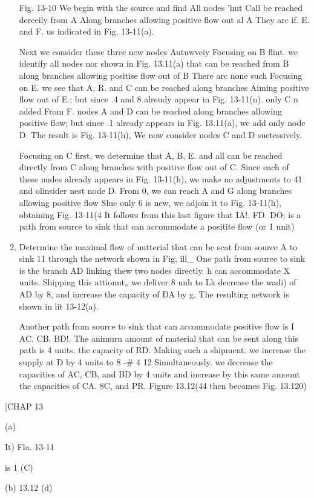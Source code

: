 \documentclass[11pt]{article} %
\begin{document}
\begin{enumerate}
Fig. 13-10 We begin with the source and find All nodes 'hut Call be reached dereeily from A Along branches allowing positive flow out al A They arc if. E. and F. us indicated in Fig. 13-11(a). 

Next we consider these three new nodes Autuwveiy Focusing on B flint. we identify all nodes nor shown in Fig. 13.11(a) that can be reached from B along branches allowing positise flow out of B There arc none such Focusing on E. we see that A, R. and C can be reached along branches Aiming positive flow out of E.; but since .4 and 8 alreudy appear in Fig. 13-11(n). only C n added From F. nodes A and D can be reached along branches allowing positive flow; but since .1 already appears in Fig. 13.11(a), we add only node D. The result is Fig. 13-11(h), We now consider nodes C and D suetessively. 

Focusing on C first, we determine that A, B, E. and all can be reached directly from C along branches with positive flow out of C. Since each of these nudes already appears in Fig. 13-11(h), we make no adjustments to 41 and olinsider nest node D. From 0, we can reach A and G along branches allowing positive flow Slue only 6 is new, we adjoin it to Fig. 13-11(h), obtaining Fig. 13-11(4 It follows from this last figure that IA!. FD. DO; is a path from source to sink that can accommodate a positite flow (or 1 unit) 
\item  Determine the maximal flow of nutterial that can be scat from source A to sink 11 through the network shown in Fig, ill_ One path from source to sink is the branch AD linking thew two nodes directly. h can accommodate X units. Shipping this attionnt„ we deliver 8 unh to Lk decrease the wadi) of AD by 8, and increase the capacity of DA by g, The resulting network is shown in lit 13-12(a). 

Another path from source to sink that can accommodate positive flow is I AC. CB. BD!. The animurn amount of material that can be sent along this path is 4 units. the capacity of RD. Making such a shipment. we increase the supply at D by 4 units to 8 -# 4 12 Simultaneously. we decrease the capacities of AC, CB, and BD by 4 units and increase by this same amount the capacities of CA. 8C, and PR. Figure 13.12(44 then becomes Fig. 13.120) 
\end{enumerate}

[CHAP 13 

(a) 

It) 
Fla. 13-11 

is 1 
(C) 

(b) 
13.12 
(d) 
\end{document}

